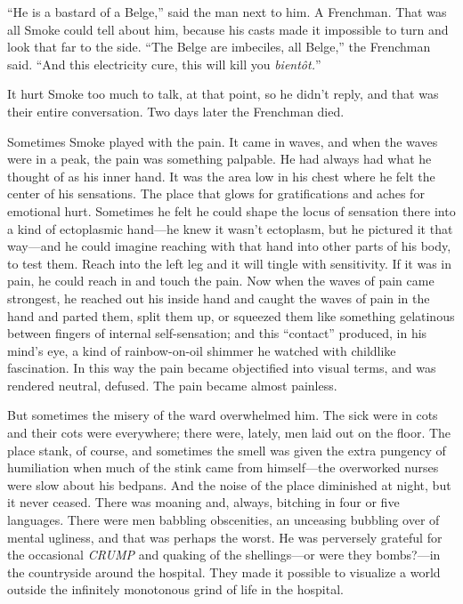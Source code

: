 ``He is a bastard of a Belge,'' said the man next to him. A Frenchman. That was all Smoke could tell about him, because his casts made it impossible to turn and look that far to the side. ``The Belge are imbeciles, all Belge,'' the Frenchman said. ``And this electricity cure, this will kill you \textit{bientôt.}''

It hurt Smoke too much to talk, at that point, so he didn't reply, and that was their entire conversation. Two days later the Frenchman died.

Sometimes Smoke played with the pain. It came in waves, and when the waves were in a peak, the pain was something palpable. He had always had what he thought of as his inner hand. It was the area low in his chest where he felt the center of his sensations. The place that glows for gratifications and aches for emotional hurt. Sometimes he felt he could shape the locus of sensation there into a kind of ectoplasmic hand---he knew it wasn't ectoplasm, but he pictured it that way---and he could imagine reaching with that hand into other parts of his body, to test them. Reach into the left leg and it will tingle with sensitivity. If it was in pain, he could reach in and touch the pain. Now when the waves of pain came strongest, he reached out his inside hand and caught the waves of pain in the hand and parted them, split them up, or squeezed them like something gelatinous between fingers of internal self-sensation; and this ``contact'' produced, in his mind's eye, a kind of rainbow-on-oil shimmer he watched with childlike fascination. In this way the pain became objectified into visual terms, and was rendered neutral, defused. The pain became almost painless.

But sometimes the misery of the ward overwhelmed him. The sick were in cots and their cots were everywhere; there were, lately, men laid out on the floor. The place stank, of course, and sometimes the smell was given the extra pungency of humiliation when much of the stink came from himself---the overworked nurses were slow about his bedpans. And the noise of the place diminished at night, but it never ceased. There was moaning and, always, bitching in four or five languages. There were men babbling obscenities, an unceasing bubbling over of mental ugliness, and that was perhaps the worst. He was perversely grateful for the occasional \textit{CRUMP} and quaking of the shellings---or were they bombs?---in the countryside around the hospital. They made it possible to visualize a world outside the infinitely monotonous grind of life in the hospital.

